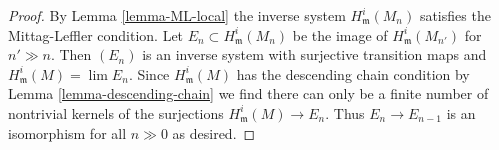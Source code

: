 \documentclass[10pt,a4paper]{amsart}
\theoremstyle{plain}
\theoremstyle{definition}
\theoremstyle{remark}
\numberwithin{equation}{subsection}
\def\lim{\mathop{\mathrm{lim}}\nolimits}
\begin{document}
\begin{proof}
By Lemma \ref{lemma-ML-local} the inverse system $H^i_\mathfrak m(M_n)$
satisfies the Mittag-Leffler condition. Let $E_n \subset H^i_\mathfrak m(M_n)$
be the image of $H^i_\mathfrak m(M_{n'})$ for $n' \gg n$.
Then $(E_n)$ is an inverse system with surjective transition maps
and $H^i_\mathfrak m(M) = \lim E_n$. Since $H^i_\mathfrak m(M)$
has the descending chain condition by
Lemma \ref{lemma-descending-chain}
we find there can only be a finite number of nontrivial
kernels of the surjections $H^i_\mathfrak m(M) \to E_n$.
Thus $E_n \to E_{n - 1}$ is an isomorphism for all $n \gg 0$
as desired.
\end{proof}
\end{document}
